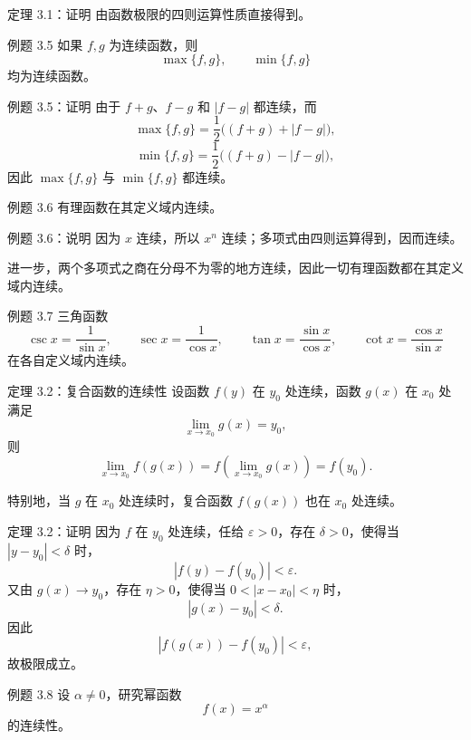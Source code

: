 ﻿\documentclass[aspectratio=169,11pt]{ctexbeamer}
\begin{document}
\begin{frame}{定理 3.1：证明}
由函数极限的四则运算性质直接得到。
\end{frame}

\begin{frame}{例题 3.5}
如果 $f,g$ 为连续函数，则
\[
  \max\{f,g\},\qquad \min\{f,g\}
\]
均为连续函数。
\end{frame}

\begin{frame}{例题 3.5：证明}
由于 $f+g$、$f-g$ 和 $|f-g|$ 都连续，而
\[
  \max\{f,g\}=\frac12\bigl((f+g)+|f-g|\bigr),
\]
\[
  \min\{f,g\}=\frac12\bigl((f+g)-|f-g|\bigr),
\]
因此 $\max\{f,g\}$ 与 $\min\{f,g\}$ 都连续。
\end{frame}

\begin{frame}{例题 3.6}
有理函数在其定义域内连续。
\end{frame}

\begin{frame}{例题 3.6：说明}
因为 $x$ 连续，所以 $x^n$ 连续；多项式由四则运算得到，因而连续。

\vspace{0.6em}
进一步，两个多项式之商在分母不为零的地方连续，因此一切有理函数都在其定义域内连续。
\end{frame}

\begin{frame}{例题 3.7}
三角函数
\[
  \csc x=\frac1{\sin x},\qquad \sec x=\frac1{\cos x},\qquad
  \tan x=\frac{\sin x}{\cos x},\qquad \cot x=\frac{\cos x}{\sin x}
\]
在各自定义域内连续。
\end{frame}

\begin{frame}{定理 3.2：复合函数的连续性}
设函数 $f(y)$ 在 $y_0$ 处连续，函数 $g(x)$ 在 $x_0$ 处满足
\[
  \lim_{x\to x_0}g(x)=y_0,
\]
则
\[
  \lim_{x\to x_0}f(g(x))=f\!\left(\lim_{x\to x_0}g(x)\right)=f(y_0).
\]

特别地，当 $g$ 在 $x_0$ 处连续时，复合函数 $f(g(x))$ 也在 $x_0$ 处连续。
\end{frame}

\begin{frame}{定理 3.2：证明}
因为 $f$ 在 $y_0$ 处连续，任给 $\varepsilon>0$，存在 $\delta>0$，使得当 $|y-y_0|<\delta$ 时，
\[
  |f(y)-f(y_0)|<\varepsilon.
\]
又由 $g(x)\to y_0$，存在 $\eta>0$，使得当 $0<|x-x_0|<\eta$ 时，
\[
  |g(x)-y_0|<\delta.
\]
因此
\[
  |f(g(x))-f(y_0)|<\varepsilon,
\]
故极限成立。
\end{frame}

\begin{frame}{例题 3.8}
设 $\alpha\ne 0$，研究幂函数
\[
  f(x)=x^\alpha
\]
的连续性。
\end{frame}
\end{document}
